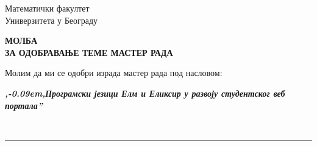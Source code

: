 \documentclass[a4paper]{article}
\def\zn{,\kern-0.09em,}
\begin{document}
\thispagestyle{empty}

\begin{flushleft}
Математички факултет\\
Универзитета у Београду
\end{flushleft}

\bigskip

\begin{center}
\textbf{МОЛБА\\
ЗА ОДОБРАВАЊЕ ТЕМЕ МАСТЕР РАДА
}\end{center}

\bigskip

\begin{flushleft}
Молим да ми се одобри израда мастер рада под насловом:
\end{flushleft}

\begin{minipage}{16.5cm}
\textbf{\textit{\zn Програмски језици Елм и Еликсир у развоју студентског веб портала''}}
\end{minipage}\\
\rule[4mm]{17.5cm}{.05mm}
\end{document}
